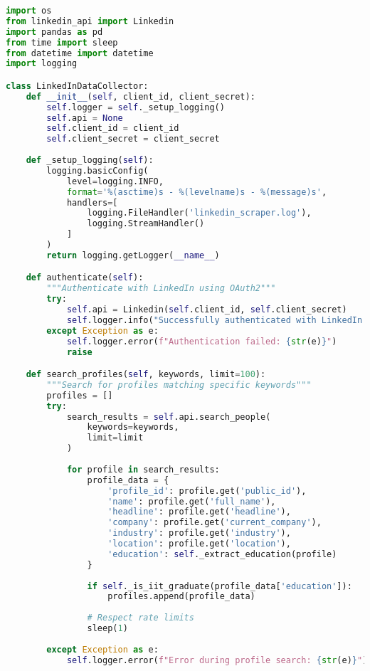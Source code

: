 \documentclass{article}
\begin{document}
\begin{lstlisting}[language=Python]
import os
from linkedin_api import Linkedin
import pandas as pd
from time import sleep
from datetime import datetime
import logging

class LinkedInDataCollector:
    def __init__(self, client_id, client_secret):
        self.logger = self._setup_logging()
        self.api = None
        self.client_id = client_id
        self.client_secret = client_secret
        
    def _setup_logging(self):
        logging.basicConfig(
            level=logging.INFO,
            format='%(asctime)s - %(levelname)s - %(message)s',
            handlers=[
                logging.FileHandler('linkedin_scraper.log'),
                logging.StreamHandler()
            ]
        )
        return logging.getLogger(__name__)

    def authenticate(self):
        """Authenticate with LinkedIn using OAuth2"""
        try:
            self.api = Linkedin(self.client_id, self.client_secret)
            self.logger.info("Successfully authenticated with LinkedIn API")
        except Exception as e:
            self.logger.error(f"Authentication failed: {str(e)}")
            raise

    def search_profiles(self, keywords, limit=100):
        """Search for profiles matching specific keywords"""
        profiles = []
        try:
            search_results = self.api.search_people(
                keywords=keywords,
                limit=limit
            )
            
            for profile in search_results:
                profile_data = {
                    'profile_id': profile.get('public_id'),
                    'name': profile.get('full_name'),
                    'headline': profile.get('headline'),
                    'company': profile.get('current_company'),
                    'industry': profile.get('industry'),
                    'location': profile.get('location'),
                    'education': self._extract_education(profile)
                }
                
                if self._is_iit_graduate(profile_data['education']):
                    profiles.append(profile_data)
                
                # Respect rate limits
                sleep(1)
                
        except Exception as e:
            self.logger.error(f"Error during profile search: {str(e)}")
            

\end{lstlisting}
\end{document}

